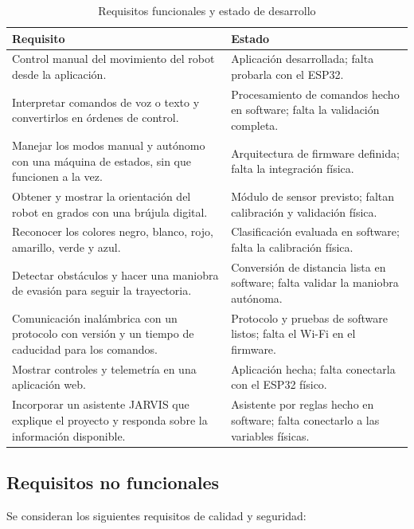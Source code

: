 \documentclass[journal]{IEEEtran}
\begin{document}
\begin{table}[t]
\centering
\caption{Requisitos funcionales y estado de desarrollo}
\label{tab:requisitos}
\scriptsize
\begin{tabular}{p{} p{}}
\toprule
\textbf{Requisito} & \textbf{Estado} \\
\midrule
Control manual del movimiento del robot desde la aplicación. & Aplicación desarrollada; falta probarla con el ESP32. \\
Interpretar comandos de voz o texto y convertirlos en órdenes de control. & Procesamiento de comandos hecho en software; falta la validación completa. \\
Manejar los modos manual y autónomo con una máquina de estados, sin que funcionen a la vez. & Arquitectura de firmware definida; falta la integración física. \\
Obtener y mostrar la orientación del robot en grados con una brújula digital. & Módulo de sensor previsto; faltan calibración y validación física. \\
Reconocer los colores negro, blanco, rojo, amarillo, verde y azul. & Clasificación evaluada en software; falta la calibración física. \\
Detectar obstáculos y hacer una maniobra de evasión para seguir la trayectoria. & Conversión de distancia lista en software; falta validar la maniobra autónoma. \\
Comunicación inalámbrica con un protocolo con versión y un tiempo de caducidad para los comandos. & Protocolo y pruebas de software listos; falta el Wi-Fi en el firmware. \\
Mostrar controles y telemetría en una aplicación web. & Aplicación hecha; falta conectarla con el ESP32 físico. \\
Incorporar un asistente JARVIS que explique el proyecto y responda sobre la información disponible. & Asistente por reglas hecho en software; falta conectarlo a las variables físicas. \\
\bottomrule
\end{tabular}
\end{table}

\subsection{Requisitos no funcionales}

Se consideran los siguientes requisitos de calidad y seguridad:
\end{document}
